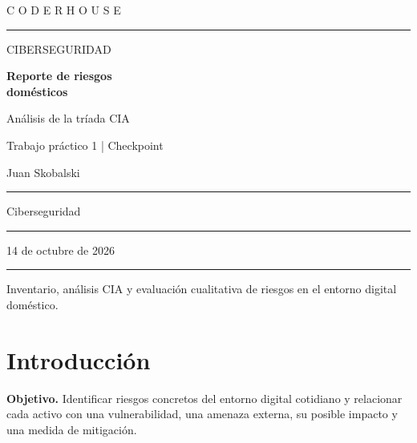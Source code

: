 \documentclass[11pt,a4paper]{article}
\begin{document}
\thispagestyle{empty}
\vspace*{1.0cm}
{\color{turquesa}\large C O D E R H O U S E}\par
\vspace{0.4cm}
{\color{linea}\rule{\textwidth}{1.2pt}}\par
\vspace{2.4cm}
{\color{gris}\Large CIBERSEGURIDAD}\par
\vspace{0.45cm}
{\color{azul}\Huge\bfseries Reporte de riesgos\\[5pt] domésticos}\par
\vspace{0.45cm}
{\color{turquesa}\LARGE Análisis de la tríada CIA}\par
\vspace{1.0cm}
{\color{gris}\large Trabajo práctico 1 | Checkpoint}\par
\vfill
\noindent\colorbox{fondo}{%
  \begin{minipage}{\dimexpr\textwidth-2\fboxsep}
    \vspace{0.28cm}
    \noindent{}Juan Skobalski\par
    \vspace{0.18cm}\color{linea}\hrule\color{black}\vspace{0.18cm}
    \noindent{}Ciberseguridad\par
    \vspace{0.18cm}\color{linea}\hrule\color{black}\vspace{0.18cm}
    \noindent{}14 de octubre de 2026\par
    \vspace{0.28cm}
  \end{minipage}}
\vspace{0.75cm}
{\color{linea}\rule{\textwidth}{1.2pt}}\par
\vspace{0.25cm}
{\small\color{gris} Inventario, análisis CIA y evaluación cualitativa de riesgos en el entorno digital doméstico.}
\newpage

\section*{Introducción}
\textbf{Objetivo.} Identificar riesgos concretos del entorno digital cotidiano y relacionar cada activo con una vulnerabilidad, una amenaza externa, su posible impacto y una medida de mitigación.
\end{document}
